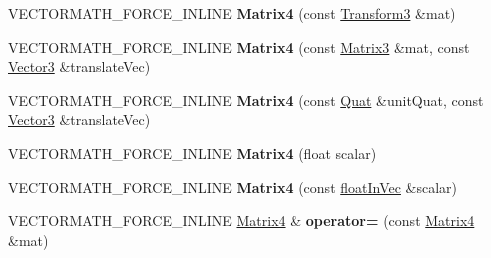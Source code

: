 \begin{DoxyCompactItemize}
\item 
\mbox{\label{classVectormath_1_1Aos_1_1Matrix4_a155dbd37559971bfcd30124bf5b66b5b}} 
V\+E\+C\+T\+O\+R\+M\+A\+T\+H\+\_\+\+F\+O\+R\+C\+E\+\_\+\+I\+N\+L\+I\+NE {\bfseries Matrix4} (const \hyperlink{classVectormath_1_1Aos_1_1Transform3}{Transform3} \&mat)
\item 
\mbox{\label{classVectormath_1_1Aos_1_1Matrix4_a136146577c4e69585bde9e17fd7739fd}} 
V\+E\+C\+T\+O\+R\+M\+A\+T\+H\+\_\+\+F\+O\+R\+C\+E\+\_\+\+I\+N\+L\+I\+NE {\bfseries Matrix4} (const \hyperlink{classVectormath_1_1Aos_1_1Matrix3}{Matrix3} \&mat, const \hyperlink{classVectormath_1_1Aos_1_1Vector3}{Vector3} \&translate\+Vec)
\item 
\mbox{\label{classVectormath_1_1Aos_1_1Matrix4_ac3baa078bb8fc98ffc65cc32c36c5e6e}} 
V\+E\+C\+T\+O\+R\+M\+A\+T\+H\+\_\+\+F\+O\+R\+C\+E\+\_\+\+I\+N\+L\+I\+NE {\bfseries Matrix4} (const \hyperlink{classVectormath_1_1Aos_1_1Quat}{Quat} \&unit\+Quat, const \hyperlink{classVectormath_1_1Aos_1_1Vector3}{Vector3} \&translate\+Vec)
\item 
\mbox{\label{classVectormath_1_1Aos_1_1Matrix4_ab38c1cbd9bacd23df03ac5ed70755d2f}} 
V\+E\+C\+T\+O\+R\+M\+A\+T\+H\+\_\+\+F\+O\+R\+C\+E\+\_\+\+I\+N\+L\+I\+NE {\bfseries Matrix4} (float scalar)
\item 
\mbox{\label{classVectormath_1_1Aos_1_1Matrix4_aa60ecfaef86b53ff416286fa73813baa}} 
V\+E\+C\+T\+O\+R\+M\+A\+T\+H\+\_\+\+F\+O\+R\+C\+E\+\_\+\+I\+N\+L\+I\+NE {\bfseries Matrix4} (const \hyperlink{classVectormath_1_1floatInVec}{float\+In\+Vec} \&scalar)
\item 
\mbox{\label{classVectormath_1_1Aos_1_1Matrix4_a267c74e0e3314b54ae0494c8de619736}} 
V\+E\+C\+T\+O\+R\+M\+A\+T\+H\+\_\+\+F\+O\+R\+C\+E\+\_\+\+I\+N\+L\+I\+NE \hyperlink{classVectormath_1_1Aos_1_1Matrix4}{Matrix4} \& {\bfseries operator=} (const \hyperlink{classVectormath_1_1Aos_1_1Matrix4}{Matrix4} \&mat)
\item 
\mbox{\label{classVectormath_1_1Aos_1_1Matrix4_ac8290f5943fc0500bb973deabbb73763}} 

\end{DoxyCompactItemize}
